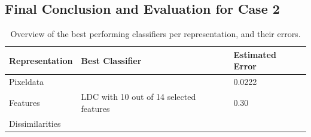 \subsection{Final Conclusion and Evaluation for Case 2}
\begin{table}[H]
	\centering
	\caption{Overview of the best performing classifiers per representation, and their errors.}
	\label{tab:concase1}
	\begin{tabular}{l|ll}
		Representation  & Best Classifier               & Estimated Error \\ \hline
		Pixeldata       &  & 0.0222          \\
		Features        & LDC with 10 out of 14 selected features                      & 0.30          \\
		Dissimilarities &                            &          
	\end{tabular}
\end{table}